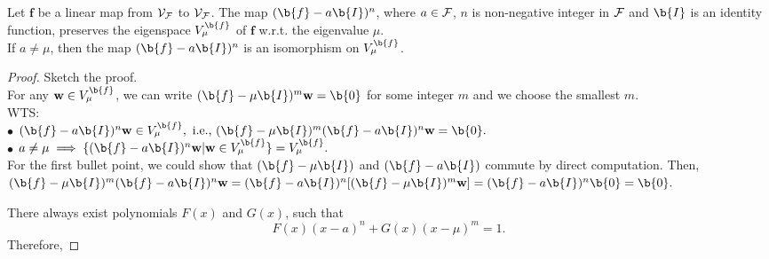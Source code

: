 \begin{proposition}
    Let $\bm f$ be a linear map from $\mathcal{V}_{\mathcal{F}}$ to $\mathcal{V}_{\mathcal{F}}$.
    The map $(\b{f} - a \b{I})^n$, where $a \in {\mathcal{F}}$, $n$ is non-negative integer in ${\mathcal{F}}$ and $\b{I}$ is an identity function, preserves the eigenspace $V_{\mu}^{\b{f}}$ of $\bm f$ w.r.t. the eigenvalue $\mu$.\\
    If $a \neq \mu$, then the map $(\b{f} - a \b{I})^n$ is an isomorphism on $V_{\mu}^{\b{f}}$.
\end{proposition}
%
\begin{proof}
    Sketch the proof.\\
    For any $\w \in V_{\mu}^{\b{f}}$, we can write $(\b{f} - \mu \b{I})^m \w = \b{0}$ for some integer $m$ and we choose the smallest $m$.\\
    WTS: \\
    $\bullet$ $(\b{f} - a \b{I})^n \w \in V_{\mu}^{\b{f}}, \textnormal{ i.e., }  (\b{f} - \mu \b{I})^m (\b{f} - a \b{I})^n \w = \b{0}.$\\
    $\bullet$ $ a \neq \mu \implies \{ (\b{f} - a \b{I})^n\w | \w \in V_{\mu}^{\b{f}}\} = V_{\mu}^{\b{f}}.$\\

    For the first bullet point, we could show that $(\b{f} - \mu \b{I})$ and $(\b{f} - a \b{I})$ commute by direct computation.
    Then, 
    $(\b{f} - \mu \b{I})^m (\b{f} - a \b{I})^n \w =  (\b{f} - a \b{I})^n [(\b{f} - \mu \b{I})^m \w] = (\b{f} - a \b{I})^n \b{0} = \b{0}.$




    
    There always exist polynomials $F(x)$ and $G(x)$, such that 
    $$F(x) (x-a)^n + G(x) (x-\mu)^m = 1.$$
    Therefore,
\end{proof}